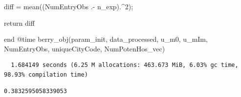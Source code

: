 \documentclass[
  letterpaper,
  DIV=11,
  numbers=noendperiod]{scrreprt}
\newenvironment{Shaded}{\begin{snugshade}}{\end{snugshade}}
\newcommand{\ControlFlowTok}[1]{\textcolor[rgb]{0.00,0.23,0.31}{#1}}
\newcommand{\FloatTok}[1]{\textcolor[rgb]{0.68,0.00,0.00}{#1}}
\newcommand{\FunctionTok}[1]{\textcolor[rgb]{0.28,0.35,0.67}{#1}}
\newcommand{\KeywordTok}[1]{\textcolor[rgb]{0.00,0.23,0.31}{#1}}
\newcommand{\NormalTok}[1]{\textcolor[rgb]{0.00,0.23,0.31}{#1}}
\newcommand{\OperatorTok}[1]{\textcolor[rgb]{0.37,0.37,0.37}{#1}}
\newcommand{\PreprocessorTok}[1]{\textcolor[rgb]{0.68,0.00,0.00}{#1}}
\begin{document}
\begin{Shaded}
\begin{Highlighting}[]
\NormalTok{    diff }\OperatorTok{=} \FunctionTok{mean}\NormalTok{((NumEntryObs }\OperatorTok{.{-}}\NormalTok{ n\_exp)}\OperatorTok{.\^{}}\FloatTok{2}\NormalTok{);}

    \ControlFlowTok{return}\NormalTok{ diff}
    
\KeywordTok{end}
\PreprocessorTok{@time} \FunctionTok{berry\_obj}\NormalTok{(param\_init, data\_processed, u\_m0, u\_mIm, NumEntryObs, uniqueCityCode, NumPotenHos\_vec)}
\end{Highlighting}
\end{Shaded}

\begin{verbatim}
  1.684149 seconds (6.25 M allocations: 463.673 MiB, 6.03% gc time, 98.93% compilation time)
\end{verbatim}

\begin{verbatim}
0.3832595058339053
\end{verbatim}
\end{document}
